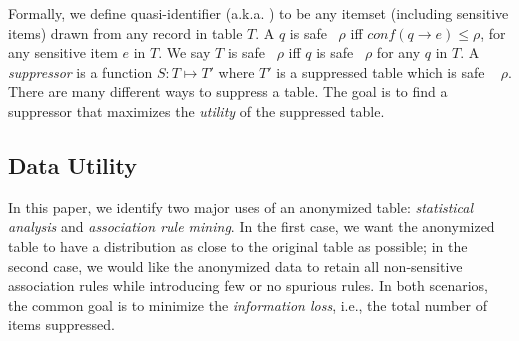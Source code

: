 Formally, we define {quasi-identifier} (a.k.a. \qid) to be any itemset
(including sensitive items) drawn from any record in table $T$.
A \qid $q$ is safe \wrt~$\rho$ iff $conf(q \rightarrow e)\leq\rho$,
for any sensitive item $e$ in $T$.
We say $T$ is safe \wrt~$\rho$ iff $q$ is safe \wrt~$\rho$ for any
\qid $q$ in $T$.
A \emph{suppressor} is a function
$S : T \mapsto T'$ where $T'$ is a suppressed table which is
safe \wrt~ $\rho$.
There are many different ways to suppress a table. The goal
is to find a suppressor that maximizes the {\em utility} of the suppressed
table.

\subsection{Data Utility}
\label{sec:du}
In this paper, we identify two major uses of an anonymized table:
{\em statistical analysis} and {\em association rule mining}.
In the first case, we want the anonymized table to have a distribution
as close to the original table as possible;
in the second case,
we would like the anonymized data to
retain all non-sensitive association rules while introducing few
or no spurious rules.
In both scenarios, the common goal is
to minimize the {\em information loss}, i.e.,
the total number of items suppressed.

